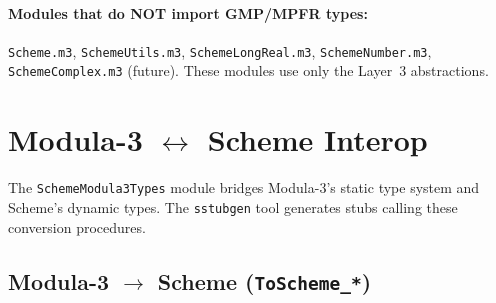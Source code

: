 \documentclass[12pt]{article}
\begin{document}
\paragraph{Modules that do NOT import GMP/MPFR types:}
{\tt Scheme.m3}, {\tt SchemeUtils.m3}, {\tt SchemeLongReal.m3},
{\tt SchemeNumber.m3}, {\tt SchemeComplex.m3} (future).
These modules use only the Layer~3 abstractions.

\section{Modula-3 $\leftrightarrow$ Scheme Interop}
\label{sec:interop}

The {\tt SchemeModula3Types} module bridges Modula-3's static type
system and Scheme's dynamic types.  The {\tt sstubgen} tool
generates stubs calling these conversion procedures.

\subsection{Modula-3 $\to$ Scheme ({\tt ToScheme\_*})}
\label{sec:m3-to-scheme}
\end{document}
